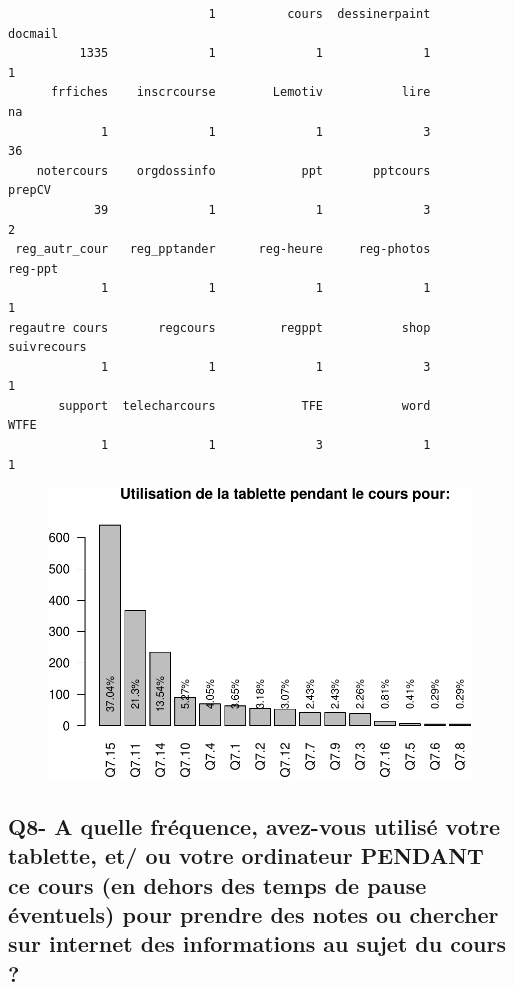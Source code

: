 \documentclass[]{article}
\begin{document}
\begin{verbatim}
                            1          cours  dessinerpaint        docmail 
          1335              1              1              1              1 
      frfiches    inscrcourse        Lemotiv           lire             na 
             1              1              1              3             36 
    notercours    orgdossinfo            ppt       pptcours         prepCV 
            39              1              1              3              2 
 reg_autr_cour   reg_pptander      reg-heure     reg-photos        reg-ppt 
             1              1              1              1              1 
regautre cours       regcours         regppt           shop    suivrecours 
             1              1              1              3              1 
       support  telecharcours            TFE           word           WTFE 
             1              1              3              1              1 
\end{verbatim}

\begin{figure}[htbp]
\centering
\includegraphics{qs_etudiants_files/figure-latex/q7-1.pdf}
\end{figure}

\subsection{Q8- A quelle fréquence, avez-vous utilisé votre tablette,
et/ ou votre ordinateur PENDANT ce cours (en dehors des temps de pause
éventuels) pour prendre des notes ou chercher sur internet des
informations au sujet du cours
?}\label{q8--a-quelle-frequence-avez-vous-utilise-votre-tablette-et-ou-votre-ordinateur-pendant-ce-cours-en-dehors-des-temps-de-pause-eventuels-pour-prendre-des-notes-ou-chercher-sur-internet-des-informations-au-sujet-du-cours}
\end{document}
